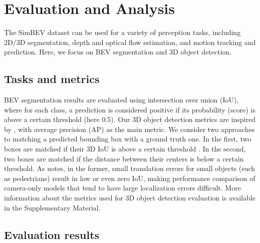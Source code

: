 \section{Evaluation and Analysis} \label{sec:eval}

The SimBEV dataset can be used for a variety of perception tasks, including 2D/3D segmentation, depth and optical flow estimation, and motion tracking and prediction. Here, we focus on BEV segmentation and 3D object detection.

\subsection{Tasks and metrics} \label{subsec:eval-metrics}

BEV segmentation results are evaluated using intersection over union (IoU), where for each class, a prediction is considered positive if its probability (score) is above a certain threshold (here 0.5). Our 3D object detection metrics are inspired by \cite{caesar2020nuscenes}, with average precision (AP) as the main metric. We consider two approaches to matching a predicted bounding box with a ground truth one. In the first, two boxes are matched if their 3D IoU is above a certain threshold \cite{geiger2013vision, cordts2016cityscapes}. In the second, two boxes are matched if the distance between their centers is below a certain threshold. As \cite{caesar2020nuscenes} notes, in the former, small translation errors for small objects (such as pedestrians) result in low or even zero IoU, making performance comparison of camera-only models that tend to have large localization errors difficult. More information about the metrics used for 3D object detection evaluation is available in the Supplementary Material.

\subsection{Evaluation results} \label{subsec:eval-results}

